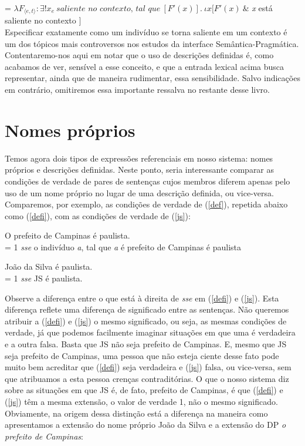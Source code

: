 \n {} = $\lambda F_{\langle e,t\rangle}:\exists !x_{e}\ \textit{saliente no contexto, tal que}\ [F'(x)].\ \iota x[F'(x)\ \& $ \textit{x} está saliente no contexto $]$\\

\n Especificar exatamente como um indivíduo se torna saliente em
um contexto é um dos tópicos mais controversos nos estudos da
interface Se\-mân\-ti\-ca-Prag\-má\-ti\-ca.
Con\-ten\-ta\-re\-mo-\-nos aqui em notar que o uso de descrições
definidas é, como acabamos de ver, sensível a esse conceito, e que
a entrada lexical acima busca representar, ainda que de maneira
rudimentar, essa sensibilidade. Salvo indicações em contrário, omitiremos essa importante ressalva no restante desse livro.



\section{Nomes próprios}


Temos agora dois tipos de expressões referenciais em nosso
sistema: nomes próprios e descrições definidas. Neste ponto, seria
interessante comparar as condições de verdade de pares de
sentenças cujos membros diferem apenas pelo uso de um nome próprio
no lugar de uma descrição definida, ou vice-versa. Comparemos, por
exemplo, as condições de verdade de (\ref{def}), repetida abaixo
como (\ref{defi}), com as condições de verdade de (\ref{js}):

\begin{exe}
\ex O prefeito de Campinas é paulista.\\
\den{(\ref{defi})} = 1 \textit{sse} o indivíduo \textit{a}, tal
que \textit{a} é prefeito de Campinas é paulista\label{defi}
\end{exe}

\begin{exe}
\ex João da Silva é paulista.\\
\den{(\ref{js})} = 1 \textit{sse} JS é paulista.\label{js}
\end{exe}


\n Observe a diferença entre o que está à direita de \textit{sse}
em (\ref{defi}) e (\ref{js}). Esta diferença reflete uma diferença
de significado entre as sentenças. Não queremos atribuir a
(\ref{defi}) e (\ref{js}) o mesmo significado, ou seja, as mesmas
condições de verdade, já que podemos facilmente imaginar situações
em que uma é verdadeira e a outra falsa. Basta que JS não seja
prefeito de Campinas. E, mesmo que JS seja prefeito de Campinas,
uma pessoa que não esteja ciente desse fato pode muito bem
acreditar que (\ref{defi}) seja verdadeira e (\ref{js}) falsa, ou
vice-versa, sem que atribuamos a esta pessoa crenças
contraditórias. O que o nosso sistema diz sobre as situações em
que JS é, de fato, prefeito de Campinas, é que (\ref{defi}) e
(\ref{js}) têm a mesma extensão, o valor de verdade 1, não o mesmo
significado. Obviamente, na origem dessa distinção está a
diferença na maneira como apresentamos a extensão do nome próprio
João da Silva e a extensão do DP \textit{o prefeito de Campinas}:\\


